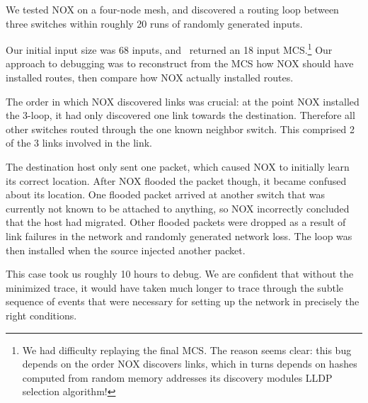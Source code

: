 We tested NOX on a four-node mesh, and discovered a
routing loop between three switches
within
roughly 20 runs of randomly generated inputs.

Our initial input size was 68 inputs, and
\projectname~returned an 18 input MCS.\footnote{We had difficulty replaying
the final MCS. The reason seems clear: this bug depends on the
order NOX discovers links, which in turns depends on hashes computed from random memory
addresses its discovery modules LLDP selection algorithm!}
Our approach to debugging was to
reconstruct from the MCS how NOX should have installed routes, then compare
how NOX actually installed routes.

The order in which NOX discovered links was crucial: at the point NOX
installed the 3-loop, it had only discovered one link towards the destination.
Therefore all other switches routed through the one known neighbor switch.
This comprised 2 of the 3 links involved in the link.

The destination host only sent one packet, which caused NOX to initially learn
its correct location. After NOX flooded the packet though, it became confused
about its location. One flooded packet arrived at
another switch that was currently not known to be attached to anything, so NOX
incorrectly concluded that the host had migrated. Other flooded packets were
dropped as a result of link failures in the network and randomly generated
network loss. The loop was then installed when the source injected another
packet.

This case took us roughly 10 hours to debug. We are confident that without the
minimized trace, it would have taken much
longer to trace through the subtle sequence of events that were necessary for
setting up the network in precisely the right conditions.



